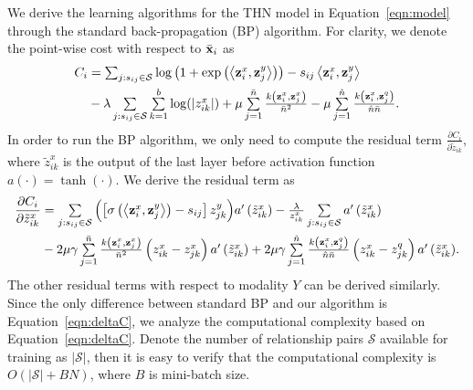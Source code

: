 \documentclass{article}
\begin{document}
We derive the learning algorithms for the THN model in Equation~\eqref{eqn:model} through the standard back-propagation (BP) algorithm. For clarity, we denote the point-wise cost with respect to ${\bar{\bf x}}_i$ as
\begin{equation}
\begin{aligned}
  {C_i} &= \textstyle{\sum\nolimits_{j:s_{ij}\in{\cal S}} {\log \left( {1 + \exp \left( {\left\langle {{\bf{z}}_i^x,{\bf{z}}_j^y} \right\rangle } \right)} \right) - {s_{ij}}\left\langle {{\bf{z}}_i^x,{\bf{z}}_j^y} \right\rangle } }  \\
   & - \textstyle{ \lambda \sum\limits_{j:s_{ij}\in{\cal S}} {\sum\limits_{k = 1}^b {\log (\left| {z_{ik}^x} \right|)} }  + \mu \sum\limits_{j = 1}^{\bar n} {\frac{{k\left( {{\bf{z}}_i^x,{\bf{z}}_j^x} \right)}}{{{{\bar n}^2}}}}  - \mu \sum\limits_{j = 1}^{\hat n} {\frac{{k\left( {{\bf{z}}_i^x,{\bf{z}}_j^q} \right)}}{{\hat n\bar n}}}}.  \\ 
\end{aligned} 
\end{equation}
In order to run the BP algorithm, we only need to compute the residual term $\frac{{\partial {C_i}}}{{\partial {{\tilde z}_{ik}}}}$, where ${{{\tilde z}_{ik}^x}}$ is the output of the last layer before activation function $a(\cdot)=\tanh(\cdot)$. We derive the residual term as
\begin{equation}\label{eqn:deltaC}
\begin{aligned}
  \frac{{\partial {C_i}}}{{\partial \tilde z_{ik}^x}} & = \textstyle{\sum\limits_{j:{s_{ij}} \in \mathcal{S}} {\left( {\left[ {\sigma \left( {\left\langle {{\bf{z}}_i^x,{\bf{z}}_j^y} \right\rangle } \right) - {s_{ij}}} \right]z_{jk}^y} \right)} a'\left( {\tilde z_{ik}^x} \right) - \frac{\lambda }{{z_{ik}^x}}\sum\limits_{j:{s_{ij}} \in \mathcal{S}} {a'\left( {\tilde z_{ik}^x} \right)} } \\
   & - \textstyle{ 2\mu \gamma \sum\limits_{j = 1}^{\bar n} {\frac{{k\left( {{\bf{z}}_i^x,{\bf{z}}_j^x} \right)}}{{{{\bar n}^2}}}\left( {z_{ik}^x - z_{jk}^x} \right)a'\left( {\tilde z_{ik}^x} \right)}  + 2\mu \gamma \sum\limits_{j = 1}^{\hat n} {\frac{{k\left( {{\bf{z}}_i^x,{\bf{z}}_j^q} \right)}}{{\hat n\bar n}}\left( {z_{ik}^x - z_{jk}^q} \right)a'\left( {\tilde z_{ik}^x} \right)}}.  \\ 
\end{aligned}
\end{equation}
The other residual terms with respect to modality $Y$ can be derived similarly. Since the only difference between standard BP and our algorithm is Equation~\eqref{eqn:deltaC}, we analyze the computational complexity based on Equation~\eqref{eqn:deltaC}. Denote the number of relationship pairs $\mathcal{S}$ available for training as $|\mathcal{S}|$, then it is easy to verify that the computational complexity is $O(|\mathcal{S}| + BN)$, where $B$ is mini-batch size.
\end{document}
